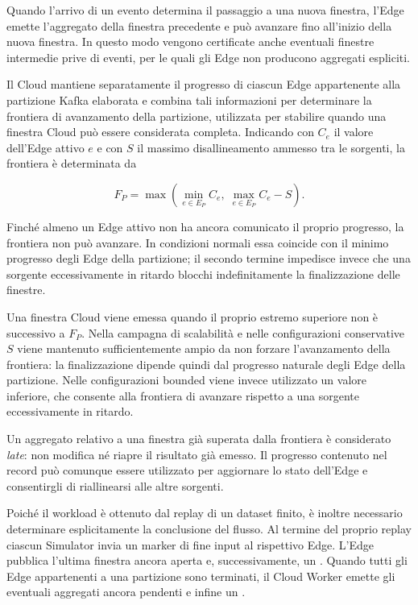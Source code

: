 Quando l'arrivo di un evento determina il passaggio a una nuova finestra,
l'Edge emette l'aggregato della finestra precedente e può avanzare
 fino all'inizio della nuova finestra. In questo modo
vengono certificate anche eventuali finestre intermedie prive di eventi,
per le quali gli Edge non producono aggregati espliciti.

Il Cloud mantiene separatamente il progresso di ciascun Edge appartenente
alla partizione Kafka elaborata e combina tali informazioni per determinare
la frontiera di avanzamento della partizione, utilizzata per stabilire quando
una finestra Cloud può essere considerata completa. Indicando con $C_e$ il
valore  dell'Edge attivo $e$ e con $S$ il massimo
disallineamento ammesso tra le sorgenti, la frontiera è determinata da

\begin{equation}
F_P =
\max\left(
    \min_{e \in E_P} C_e,\;
    \max_{e \in E_P} C_e - S
\right).
\end{equation}

Finché almeno un Edge attivo non ha ancora comunicato il proprio progresso,
la frontiera non può avanzare. In condizioni normali essa coincide con il
minimo progresso degli Edge della partizione; il secondo termine impedisce
invece che una sorgente eccessivamente in ritardo blocchi indefinitamente
la finalizzazione delle finestre.

Una finestra Cloud viene emessa quando il proprio estremo superiore non è
successivo a $F_P$. Nella campagna di scalabilità e nelle configurazioni conservative $S$ viene
mantenuto sufficientemente ampio da non forzare l'avanzamento della frontiera:
la finalizzazione dipende quindi dal progresso naturale degli Edge della
partizione. Nelle configurazioni bounded viene invece utilizzato un valore
inferiore, che consente alla frontiera di avanzare rispetto a una sorgente
eccessivamente in ritardo.

Un aggregato relativo a una finestra già superata dalla frontiera è
considerato \emph{late}: non modifica né riapre il risultato già emesso.
Il progresso contenuto nel record può comunque essere utilizzato per
aggiornare lo stato dell'Edge e consentirgli di riallinearsi alle altre
sorgenti.

Poiché il workload è ottenuto dal replay di un dataset finito, è inoltre
necessario determinare esplicitamente la conclusione del flusso. Al termine
del proprio replay ciascun Simulator invia un marker di fine input al
rispettivo Edge. L'Edge pubblica l'ultima finestra ancora aperta e,
successivamente, un . Quando tutti gli Edge appartenenti
a una partizione sono terminati, il Cloud Worker emette gli eventuali
aggregati ancora pendenti e infine un .

